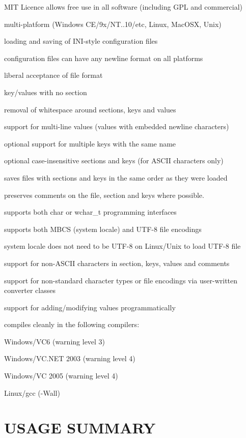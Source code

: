 \begin{DoxyItemize}
\item M\+IT Licence allows free use in all software (including G\+PL and commercial)
\item multi-\/platform (Windows C\+E/9x/\+NT..10/etc, Linux, Mac\+O\+SX, Unix)
\item loading and saving of I\+N\+I-\/style configuration files
\item configuration files can have any newline format on all platforms
\item liberal acceptance of file format
\begin{DoxyItemize}
\item key/values with no section
\item removal of whitespace around sections, keys and values
\end{DoxyItemize}
\item support for multi-\/line values (values with embedded newline characters)
\item optional support for multiple keys with the same name
\item optional case-\/insensitive sections and keys (for A\+S\+C\+II characters only)
\item saves files with sections and keys in the same order as they were loaded
\item preserves comments on the file, section and keys where possible.
\item supports both char or wchar\+\_\+t programming interfaces
\item supports both M\+B\+CS (system locale) and U\+T\+F-\/8 file encodings
\item system locale does not need to be U\+T\+F-\/8 on Linux/\+Unix to load U\+T\+F-\/8 file
\item support for non-\/\+A\+S\+C\+II characters in section, keys, values and comments
\item support for non-\/standard character types or file encodings via user-\/written converter classes
\item support for adding/modifying values programmatically
\item compiles cleanly in the following compilers\+:
\begin{DoxyItemize}
\item Windows/\+V\+C6 (warning level 3)
\item Windows/\+V\+C.\+N\+ET 2003 (warning level 4)
\item Windows/\+VC 2005 (warning level 4)
\item Linux/gcc (-\/\+Wall)
\end{DoxyItemize}
\end{DoxyItemize}\hypertarget{index_usage}{}\section{U\+S\+A\+G\+E S\+U\+M\+M\+A\+RY}\label{index_usage}

